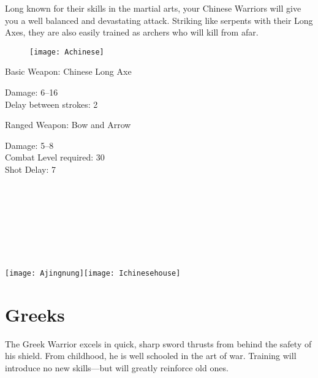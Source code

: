 
Long known for their skills in the martial arts, your Chinese Warriors will give you a well balanced and devastating attack. Striking like serpents with their Long Axes, they are also easily trained as archers who will kill from afar.

\begin{wrapfigure}{r}{0.5\textwidth}
	\begin{center}
		\vspace{-20pt}
		\texttt{[image: Achinese]}
	\end{center}
	\vspace{-20pt}
\end{wrapfigure}

Basic Weapon: Chinese Long Axe
\begin{adjustwidth}{1cm}{}
	Damage: 6–16 \\
	Delay between strokes: 2
\end{adjustwidth}
Ranged Weapon: Bow and Arrow
\begin{adjustwidth}{1cm}{}
	Damage: 5–8 \\
	Combat Level required: 30 \\
	Shot Delay: 7 \\ \\ \\ \\ \\ \\ \\ \\ 
\end{adjustwidth}

\begin{center}
\texttt{[image: Ajingnung]}\texttt{[image: Ichinesehouse]}
\end{center}

\clearpage

\section{Greeks}


The Greek Warrior excels in quick, sharp sword thrusts from behind the safety of his shield. From childhood, he is well schooled in the art of war. Training will introduce no new skills---but will greatly reinforce old ones.

